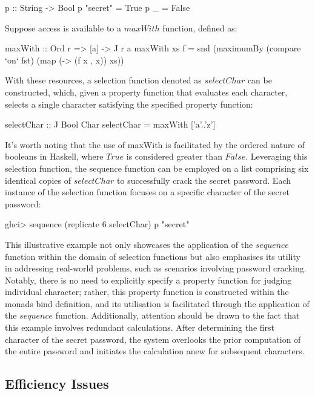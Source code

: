 \documentclass[runningheads]{llncs}
\begin{document}
\begin{code}
p :: String -> Bool
p "secret" = True
p _        = False
\end{code}

Suppose access is available to a \(maxWith\) function, defined as:

\begin{code}
maxWith :: Ord r => [a] -> J r a
maxWith xs f = snd (maximumBy (compare `on` fst) 
                              (map (\x -> (f x , x)) xs))
\end{code}

With these resources, a selection function denoted as \(selectChar\) can
be constructed, which, given a property function that evaluates each
character, selects a single character satisfying the specified property
function:

\begin{code}
selectChar :: J Bool Char
selectChar = maxWith ['a'..'z']
\end{code}

It's worth noting that the use of maxWith is facilitated by the ordered
nature of booleans in Haskell, where \(True\) is considered greater than
\(False\). Leveraging this selection function, the sequence function can
be employed on a list comprising six identical copies of \(selectChar\)
to successfully crack the secret password. Each instance of the
selection function focuses on a specific character of the secret
password:

\begin{haskell}
ghci> sequence (replicate 6 selectChar) p
"secret"
\end{haskell}

This illustrative example not only showcases the application of the
\(sequence\) function within the domain of selection functions but also
emphasises its utility in addressing real-world problems, such as
scenarios involving password cracking. Notably, there is no need to
explicitly specify a property function for judging individual character;
rather, this property function is constructed within the monads bind
definition, and its utilisation is facilitated through the application
of the \(sequence\) function. Additionally, attention should be drawn to
the fact that this example involves redundant calculations. After
determining the first character of the secret password, the system
overlooks the prior computation of the entire password and initiates the
calculation anew for subsequent characters.

\subsection{Efficiency Issues}\label{efficiency-issues}
\end{document}
